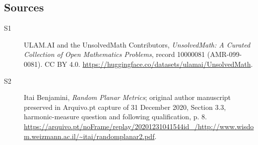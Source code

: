 \documentclass[11pt]{article}
\begin{document}
\subsection{Sources}
\begin{description}
\item[\hypertarget{source:10000081:1}{S1}] ULAM.AI and the UnsolvedMath Contributors, \emph{UnsolvedMath: A Curated Collection of Open Mathematics Problems}, record 10000081 (AMR-099-0081). CC BY 4.0. \url{https://huggingface.co/datasets/ulamai/UnsolvedMath}.
\item[\hypertarget{source:10000081:2}{S2}] Itai Benjamini, \emph{Random Planar Metrics}; original author manuscript preserved in Arquivo.pt capture of 31 December 2020, Section 3.3, harmonic-measure question and following qualification, p. 8. \url{https://arquivo.pt/noFrame/replay/20201231041544id_/http://www.wisdom.weizmann.ac.il/~itai/randomplanar2.pdf}.
\end{description}
\label{end:10000081}
\end{document}

